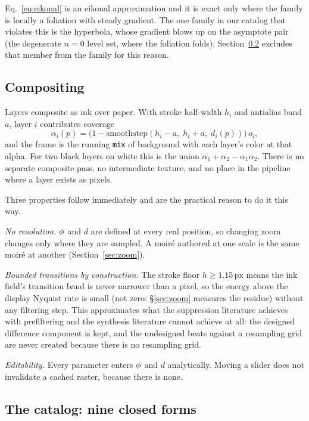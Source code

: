 Eq.~\ref{eq:eikonal} is an eikonal approximation and it is exact only where the
family is locally a foliation with steady gradient. The one family in our
catalog that violates this is the hyperbola, whose gradient blows up on the
asymptote pair (the degenerate $n=0$ level set, where the foliation folds);
Section~\ref{sec:catalog} excludes that member from the family for this
reason.

\subsection{Compositing}

Layers composite as ink over paper. With stroke half-width $h_i$ and antialias
band $a$, layer $i$ contributes coverage
\begin{equation}
  \alpha_i(p) = \Big(1-\mathrm{smoothstep}(h_i-a,\;h_i+a,\;d_i(p))\Big)\,o_i,
  \label{eq:alpha}
\end{equation}
and the frame is the running \texttt{mix} of background with each layer's color
at that alpha. For two black layers on white this is the union
$\alpha_1+\alpha_2-\alpha_1\alpha_2$. There is no separate composite pass, no
intermediate texture, and no place in the pipeline where a layer exists as pixels.

Three properties follow immediately and are the practical reason to do it this way.

\emph{No resolution.} $\phi$ and $d$ are defined at every real position, so
changing zoom changes only where they are sampled. A moir\'e authored at one scale
is the same moir\'e at another (Section~\ref{sec:zoom}).

\emph{Bounded transitions by construction.} The stroke floor
$h\ge1.15\,\mathrm{px}$ means the ink field's transition band is never narrower
than a pixel, so the energy above the display Nyquist rate is small (not zero:
\S\ref{sec:zoom} measures the residue) without any filtering step. This
approximates what the suppression literature achieves with prefiltering and the
synthesis literature cannot achieve at all: the designed difference component is
kept, and the undesigned beats against a resampling grid are never created
because there is no resampling grid.

\emph{Editability.} Every parameter enters $\phi$ and $d$ analytically. Moving a
slider does not invalidate a cached raster, because there is none.

\subsection{The catalog: nine closed forms}
\label{sec:catalog}


